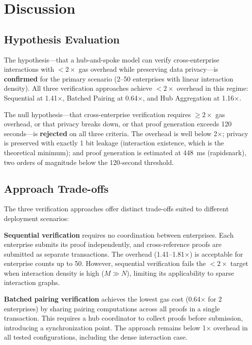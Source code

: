 
\section{Discussion}

\subsection{Hypothesis Evaluation}

The hypothesis---that a hub-and-spoke model can verify cross-enterprise
interactions with $< 2\times$ gas overhead while preserving data
privacy---is \textbf{confirmed} for the primary scenario (2--50 enterprises
with linear interaction density). All three verification approaches achieve
$< 2\times$ overhead in this regime: Sequential at 1.41$\times$, Batched
Pairing at 0.64$\times$, and Hub Aggregation at 1.16$\times$.

The null hypothesis---that cross-enterprise verification requires $\geq
2\times$ gas overhead, or that privacy breaks down, or that proof generation
exceeds 120 seconds---is \textbf{rejected} on all three criteria. The
overhead is well below 2$\times$; privacy is preserved with exactly 1 bit
leakage (interaction existence, which is the theoretical minimum); and
proof generation is estimated at 448~ms (rapidsnark), two orders of
magnitude below the 120-second threshold.

\subsection{Approach Trade-offs}

The three verification approaches offer distinct trade-offs suited to
different deployment scenarios:

\textbf{Sequential verification} requires no coordination between
enterprises. Each enterprise submits its proof independently, and
cross-reference proofs are submitted as separate transactions. The
overhead (1.41--1.81$\times$) is acceptable for enterprise counts up to 50.
However, sequential verification fails the $< 2\times$ target when
interaction density is high ($M \gg N$), limiting its applicability to
sparse interaction graphs.

\textbf{Batched pairing verification} achieves the lowest gas cost
(0.64$\times$ for 2 enterprises) by sharing pairing computations across all
proofs in a single transaction. This requires a hub coordinator to collect
proofs before submission, introducing a synchronization point. The approach
remains below 1$\times$ overhead in all tested configurations, including
the dense interaction case.

